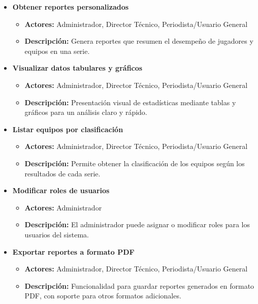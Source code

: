 \documentclass{report}
\begin{document}
\begin{itemize}
        \item \textbf{Obtener reportes personalizados}
        \begin{itemize}
            \item \textbf{Actores:} Administrador, Director Técnico, Periodista/Usuario General
            \item \textbf{Descripción:} Genera reportes que resumen el desempeño de jugadores y equipos en una serie.
        \end{itemize}
    
        \item \textbf{Visualizar datos tabulares y gráficos}
        \begin{itemize}
            \item \textbf{Actores:} Administrador, Director Técnico, Periodista/Usuario General
            \item \textbf{Descripción:} Presentación visual de estadísticas mediante tablas y gráficos para un análisis claro y rápido.
        \end{itemize}
    
        \item \textbf{Listar equipos por clasificación}
        \begin{itemize}
            \item \textbf{Actores:} Administrador, Director Técnico, Periodista/Usuario General
            \item \textbf{Descripción:} Permite obtener la clasificación de los equipos según los resultados de cada serie.
        \end{itemize}
    
        \item \textbf{Modificar roles de usuarios}
        \begin{itemize}
            \item \textbf{Actores:} Administrador
            \item \textbf{Descripción:} El administrador puede asignar o modificar roles para los usuarios del sistema.
        \end{itemize}
    
        \item \textbf{Exportar reportes a formato PDF}
        \begin{itemize}
            \item \textbf{Actores:} Administrador, Director Técnico, Periodista/Usuario General
            \item \textbf{Descripción:} Funcionalidad para guardar reportes generados en formato PDF, con soporte para otros formatos adicionales.
        \end{itemize}
    \end{itemize}
    
\end{document}
